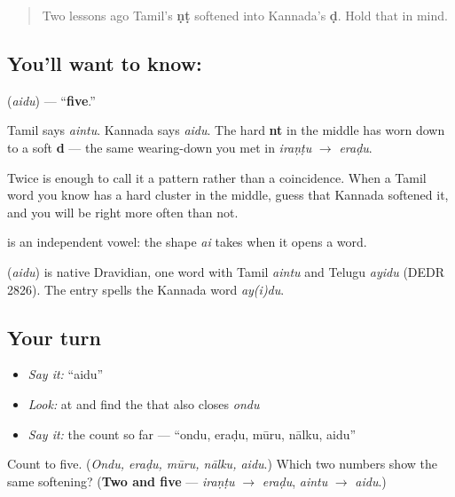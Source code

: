 \label{lesson:KA-C07-aidu}



\begin{quote}
Two lessons ago Tamil's \textbf{ṇṭ} softened into Kannada's \textbf{ḍ}. Hold that in mind.
\end{quote}

\subsection*{You'll want to know: }
\textbf{} (\emph{aidu}) — \textquotedblleft{}\textbf{five}.\textquotedblright{}

Tamil says \emph{aintu}. Kannada says \emph{aidu}. The hard \textbf{nt} in the middle has worn down to a soft \textbf{d} — the same wearing-down you met in \emph{iraṇṭu} $\to$ \emph{eraḍu}.

Twice is enough to call it a pattern rather than a coincidence. When a Tamil word you know has a hard cluster in the middle, guess that Kannada softened it, and you will be right more often than not.

\textbf{} is an independent vowel: the shape \emph{ai} takes when it opens a word.

\begin{cousinweb}
\textbf{} (\emph{aidu}) is native Dravidian, one word with Tamil \emph{aintu} and Telugu \emph{ayidu} (DEDR 2826). The entry spells the Kannada word \emph{ay(i)du}.
\end{cousinweb}

\subsection*{Your turn}
\begin{itemize}
\raggedright
  \item \emph{Say it:} \textquotedblleft{}aidu\textquotedblright{}
  \item \emph{Look:} at  and find the  that also closes \emph{ondu}
  \item \emph{Say it:} the count so far — \textquotedblleft{}ondu, eraḍu, mūru, nālku, aidu\textquotedblright{}
\end{itemize}

\begin{tcolorbox}[breakable,colback=teal!4,colframe=teal!35!black,title={Before you move on}]
Count to five. (\emph{Ondu, eraḍu, mūru, nālku, aidu}.) Which two numbers show the same softening? (\textbf{Two and five} — \emph{iraṇṭu} $\to$ \emph{eraḍu}, \emph{aintu} $\to$ \emph{aidu}.)
\end{tcolorbox}
